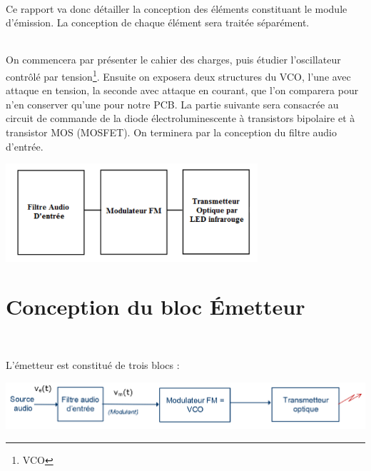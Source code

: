 \documentclass[a4paper]{report}
\begin{document}
\vspace{1cm}

\paragraph{} 
Ce rapport va donc détailler la conception des éléments constituant le module d’émission. La conception de chaque élément sera traitée séparément.

\paragraph{} 
On commencera par présenter le cahier des charges, puis étudier l'oscillateur contrôlé par tension\footnote{VCO}. Ensuite on exposera deux structures du VCO, l’une avec attaque en tension, la seconde avec attaque en courant, que l’on comparera pour n’en conserver qu’une  pour notre PCB. La partie suivante sera consacrée au circuit de commande de la diode électroluminescente à transistors bipolaire et à transistor MOS (MOSFET). On terminera par la conception du filtre audio d’entrée.\\



\begin{center}
\includegraphics[width=0.7\textwidth]{bloc_emet3.PNG}
\end{center}

\part{Conception du bloc Émetteur}

$ $ 
\vspace{6cm}

L'émetteur est constitué de trois blocs : \\

\begin{center}
\includegraphics[width=1\textwidth]{bloc_emet.PNG}
\end{center}
\end{document}
